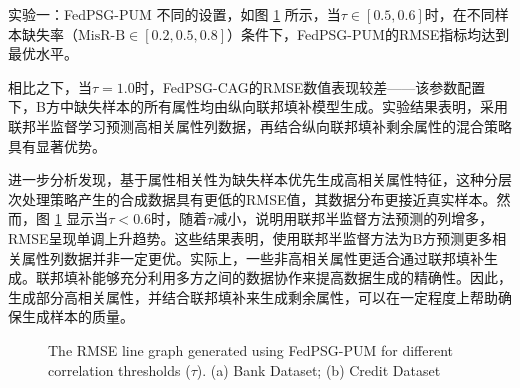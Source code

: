 实验一：FedPSG-PUM 不同的设置，如图 \ref{Chapter4Exp1Setting1} 所示，当$\tau \in [0.5,0.6]$时，在不同样本缺失率（$\text{MisR-B} \in [0.2,0.5,0.8]$）条件下，FedPSG-PUM的RMSE指标均达到最优水平。

相比之下，当$\tau = 1.0$时，FedPSG-CAG的RMSE数值表现较差——该参数配置下，B方中缺失样本的所有属性均由纵向联邦填补模型生成。实验结果表明，采用联邦半监督学习预测高相关属性列数据，再结合纵向联邦填补剩余属性的混合策略具有显著优势。

进一步分析发现，基于属性相关性为缺失样本优先生成高相关属性特征，这种分层次处理策略产生的合成数据具有更低的RMSE值，其数据分布更接近真实样本。然而，图 \ref{Chapter4Exp1Setting1} 显示当$\tau < 0.6 $时，随着$\tau$减小，说明用联邦半监督方法预测的列增多，RMSE呈现单调上升趋势。这些结果表明，使用联邦半监督方法为B方预测更多相关属性列数据并非一定更优。实际上，一些非高相关属性更适合通过联邦填补生成。联邦填补能够充分利用多方之间的数据协作来提高数据生成的精确性。因此，生成部分高相关属性，并结合联邦填补来生成剩余属性，可以在一定程度上帮助确保生成样本的质量。

\vspace{-0.1cm}
\begin{figure}[h]
	\centering
	\hspace{0.01\textwidth}  %
	
	{\centering \wuhao The RMSE line graph generated using FedPSG-PUM for different correlation thresholds ($\tau$). (a) Bank Dataset; (b) Credit Dataset}    
	\label{Chapter4Exp1Setting1}
\end{figure}
\vspace{-0.35cm}

